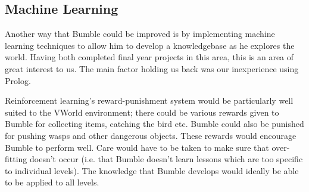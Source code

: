 \documentclass[a4paper,oneside]{report}
\begin{document}
\subsection{Machine Learning}

Another way that Bumble could be improved is by implementing machine learning techniques to allow him to develop a knowledgebase as he explores the world. Having both completed final year projects in this area, this is an area of great interest to us. The main factor holding us back was our inexperience using Prolog. 

Reinforcement learning's reward-punishment system would be particularly well suited to the VWorld environment; there could be various rewards given to Bumble for collecting items, catching the bird etc. Bumble could also be punished for pushing wasps and other dangerous objects. These rewards would encourage Bumble to perform well. Care would have to be taken to make sure that over-fitting doesn't occur (i.e. that Bumble doesn't learn lessons which are too specific to individual levels). The knowledge that Bumble develops would ideally be able to be applied to all levels.
		
\end{document}
